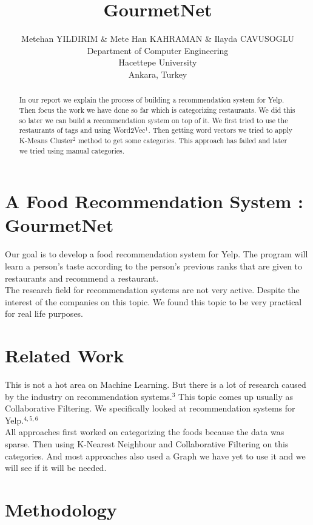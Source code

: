 \documentclass{article} %
\title{GourmetNet}
\author{Metehan YILDIRIM \& Mete Han KAHRAMAN \& Ilayda CAVUSOGLU  \\
Department of Computer Engineering\\
Hacettepe University\\
Ankara, Turkey \\
}
\begin{document}
\maketitle

\begin{abstract}
In our report we explain the process of building a recommendation system for Yelp. Then focus the work we have done so far which is categorizing restaurants. We did this so later we can build a recommendation system on top of it. We first tried to use the restaurants of tags and using Word2Vec$^1$. Then getting word vectors we tried to apply K-Means Cluster$^2$ method to get some categories. This approach has failed and later we tried using manual categories.
\end{abstract}

\section{A Food Recommendation System : GourmetNet}

Our goal is to develop a food recommendation system for Yelp. The program will learn a person's taste according to the person's previous ranks that are given to restaurants and recommend a restaurant.\\

The research field for recommendation systems are not very active. Despite the interest of the companies on this topic. We found this topic  to be very practical for real life purposes.\\
 
\section{Related Work}

This is not a hot area on Machine Learning. But there is a lot of research caused by the industry on recommendation systems.$^3$ This topic comes up usually as Collaborative Filtering. We specifically looked at recommendation systems for Yelp.$^{4, 5, 6}$ \\

All approaches first worked on categorizing the foods because the data was sparse. Then using K-Nearest Neighbour and Collaborative Filtering on this categories. And most approaches also used a Graph we have yet to use it and we will see if it will be needed.


\section{Methodology}
\end{document}
